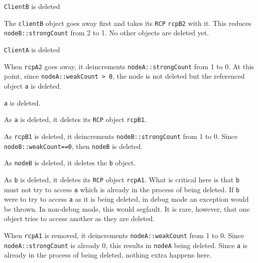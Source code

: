 \documentclass[pdf,ps2pdf,11pt]{SANDreport}
\begin{document}
\begin{description}

{}\item[a)] {}\texttt{ClientB} is deleted

  \begin{description}

  {}\item[a.1)] The {}\texttt{clientB} object goes away first and takes
  its {}\texttt{RCP} {}\texttt{rcpB2} with it.  This reduces
  {}\texttt{nodeB::strongCount} from 2 to 1.  No other objects are
  deleted yet.

  \end{description}

{}\item[b)] {}\texttt{ClientA} is deleted

  \begin{description}

  {}\item[b.1)] When {}\texttt{rcpA2} goes away, it deincrements
  {}\texttt{nodeA::strongCount} from 1 to 0.  At this point, since
  {}\texttt{nodeA::weakCount > 0}, the node is not deleted but the
  referenced object {}\texttt{a} is deleted.

  {}\item[b.2)] {}\texttt{a} is deleted.

  {}\item[b.3)] As {}\texttt{a} is deleted, it deletes its
  {}\texttt{RCP} object {}\texttt{rcpB1}.

  {}\item[b.4)] As {}\texttt{rcpB1} is deleted, it deincrements
  {}\texttt{nodeB::strongCount} from 1 to 0. Since
  {}\texttt{nodeB::weakCount==0}, then {}\texttt{nodeB} is deleted.

  {}\item[b.5)] As {}\texttt{nodeB} is deleted, it deletes the
  {}\texttt{b} object.

  {}\item[b.6)] As {}\texttt{b} is deleted, it deletes its
  {}\texttt{RCP} object {}\texttt{rcpA1}.  What is critical here is
  that {}\texttt{b} must not try to access {}\texttt{a} which is
  already in the process of being deleted.  If {}\texttt{b} were to
  try to access {}\texttt{a} as it is being deleted, in debug mode an
  exception would be thrown.  In non-debug mode, this would segfault.
  It is rare, however, that one object tries to access another as they
  are deleted.

  {}\item[b.7)] When {}\texttt{rcpA1} is removed, it deincrements
  {}\texttt{nodeA::weakCount} from 1 to 0.  Since
  {}\texttt{nodeA::strongCount} is already 0, this results in
  {}\texttt{nodeA} being deleted.  Since {}\texttt{a} is already in
  the process of being deleted, nothing extra happens here.

  \end{description}

\end{description}
\end{document}
